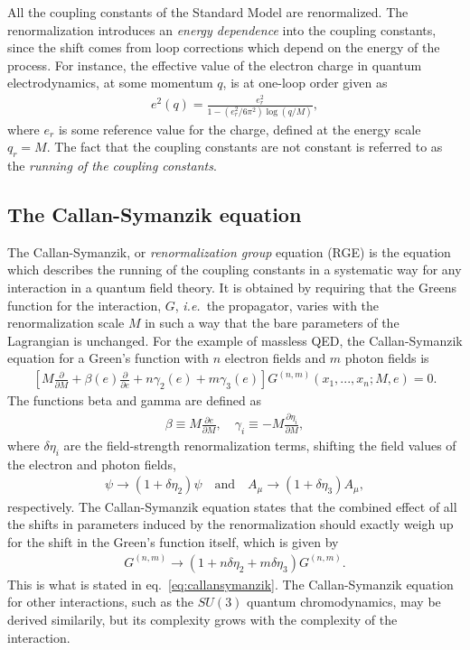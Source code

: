\documentclass[twoside,english]{uiofysmaster}
\begin{document}
All the coupling constants of the Standard Model are renormalized. The renormalization introduces an {\it energy dependence} into the coupling constants, since the shift comes from loop corrections which depend on the energy of the process. For instance, the effective value of the electron charge in quantum electrodynamics, at some momentum $q$, is at one-loop order given as
\begin{align}
	e^2(q) = \frac{e_r^2}{1 - (e_r^2/6\pi^2)\log(q/M)},\label{eq:electron_charge_running}
\end{align}
where $e_r$ is some reference value for the charge, defined at the energy scale $q_r = M$. The fact that the coupling constants are not constant is referred to as the {\it running of the coupling constants}.

\subsection{The Callan-Symanzik equation}
The Callan-Symanzik, or {\it renormalization group} equation (RGE) is the equation which describes the running of the coupling constants in a systematic way for any interaction in a quantum field theory. It is obtained by requiring that the Greens function for the interaction, $G$, {\it i.e.}\ the propagator, varies with the renormalization scale $M$ in such a way that the bare parameters of the Lagrangian is unchanged. For the example of massless QED, the Callan-Symanzik equation for a Green's function with $n$ electron fields and $m$ photon fields is \cite[p.\ 411]{Peskin-Schroeder}
\begin{align}
	\left[ M \frac{\partial}{\partial M} + \beta(e) \frac{\partial}{\partial e} + n\gamma_2(e) + m\gamma_3(e)\right] G^{(n,m)}(x_1, ..., x_n; M,e) = 0.\label{eq:callansymanzik}
\end{align}
The functions beta and gamma are defined as
\begin{align}
	\beta \equiv M\frac{\partial e}{\partial M} , \quad \gamma_i \equiv - M\frac{\partial \eta_i}{\partial M},
\end{align}
where $\delta\eta_i$ are the field-strength renormalization terms, shifting the field values of the electron and photon fields,
\begin{align}
	\psi \to (1 + \delta \eta_2) \psi \quad \mathrm{and} \quad A_\mu \to (1 + \delta\eta_3) A_\mu,
\end{align}
respectively. The Callan-Symanzik equation states that the combined effect of all the shifts in parameters induced by the renormalization should exactly weigh up for the shift in the Green's function itself, which is given by
\begin{align}
	G^{(n,m)} \to (1 + n\delta\eta_2 + m\delta\eta_3)G^{(n,m)}.
\end{align}
This is what is stated in eq.\ \eqref{eq:callansymanzik}. The Callan-Symanzik equation for other interactions, such as the $SU(3)$ quantum chromodynamics, may be derived similarily, but its complexity grows with the complexity of the interaction.
\end{document}
